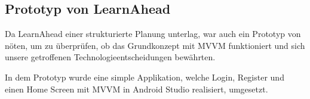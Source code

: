 \subsection{Prototyp von LearnAhead}
Da LearnAhead einer strukturierte Planung unterlag, war auch ein Prototyp von nöten, um zu überprüfen, ob das Grundkonzept mit MVVM funktioniert und sich unsere getroffenen Technologieentscheidungen bewährten. \newline

\noindent
In dem Prototyp wurde eine simple Applikation, welche Login, Register und einen Home Screen mit MVVM in Android Studio realisiert, umgesetzt. \newline